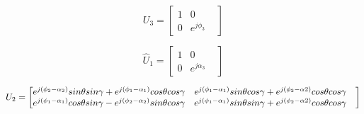 \documentclass[conference]{IEEEtran}
\begin{document}
\begin{equation*}\label{eq:16}
U_3=	\begin{bmatrix}
				1& 0 &\\
				0&  e^{j\phi_3}&
	\end{bmatrix}
\end{equation*}

\begin{equation*}\label{eq:17}
 \hat U_1 =\begin{bmatrix}
				1& 0 &\\
				0&  e^{j\alpha_3}&
	\end{bmatrix}
\end{equation*}

%

\resizebox{ 1.1\linewidth}{!}
{

	 $U_2= \begin{bmatrix}
	e^{j(\phi_2-\alpha_2)}sin\theta sin\gamma+e^{j(\phi_1-\alpha_1)}cos\theta cos\gamma  & \newline e^{j(\phi_1-\alpha_1)}sin\theta cos\gamma+e^{j(\phi_2-\alpha2)}cos\theta cos\gamma &\\
	e^{j(\phi_1-\alpha_1)}cos\theta sin\gamma-e^{j(\phi_2-\alpha_2)}sin\theta cos\gamma & \newline e^{j(\phi_1-\alpha_1)}sin\theta sin\gamma+e^{j(\phi_2-\alpha2)}cos\theta cos\gamma &
\end{bmatrix}	
$

}
\end{document}
